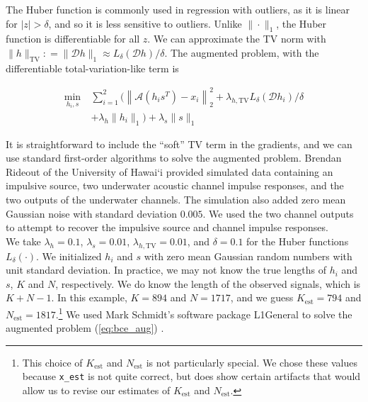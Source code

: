 \documentclass[journal]{IEEEtran}
\newcommand{\defeq}{\mathrel{\mathop:}=}
\begin{document}
\noindent The Huber function is commonly used in regression with outliers, as it is linear for $|z|>\delta$, and so it is less sensitive to outliers.  Unlike $\|\cdot\|_1$, the Huber function is differentiable for all $z$.  We can approximate the TV norm with ${\|h\|_\text{TV} \defeq\|\mathcal{D}h\|_1 \approx L_\delta(\mathcal{D}h)/\delta}$.  The augmented problem, with the differentiable total-variation-like term is

\begin{align}
   \label{eq:bce_aug}
   \min_{h_i,s} ~&\sum_{i=1}^2\biggl(\left\|\mathcal{A}(h_is^T)-x_i\right\|_2^2 + \lambda_{h,\text{TV}}L_\delta(\mathcal{D}h_i)/\delta\nonumber\\
                 &+ \lambda_{h}\|h_i\|_1\biggr) + \lambda_s\|s\|_1
\end{align}

It is straightforward to include the ``soft'' TV term in the gradients, and we can use standard first-order algorithms to solve the augmented problem.  Brendan Rideout of the University of Hawai`i provided simulated data containing an impulsive source, two underwater acoustic channel impulse responses, and the two outputs of the underwater channels.  The simulation also added zero mean Gaussian noise with standard deviation $0.005$.  We used the two channel outputs to attempt to recover the impulsive source and channel impulse responses.\\

We take $\lambda_h = 0.1$, $\lambda_s=0.01$, $\lambda_{h,\text{TV}}=0.01$, and $\delta=0.1$ for the Huber functions $L_\delta(\cdot)$.  We initialized $h_i$ and $s$ with zero mean Gaussian random numbers with unit standard deviation.  In practice, we may not know the true lengths of $h_i$ and $s$, $K$ and $N$, respectively.  We do know the length of the observed signals, which is $K+N-1$.  In this example, $K=894$ and $N=1717$, and we guess $K_\text{est}=794$ and $N_\text{est}=1817$.\footnote{This choice of $K_\text{est}$ and $N_\text{est}$ is not particularly special.  We chose these values because \texttt{x\_est} is not quite correct, but does show certain artifacts that would allow us to revise our estimates of $K_\text{est}$ and $N_\text{est}$.}  We used Mark Schmidt's software package L1General to solve the augmented problem (\ref{eq:bce_aug}) \cite{schmidt_2010}.\\
\end{document}
